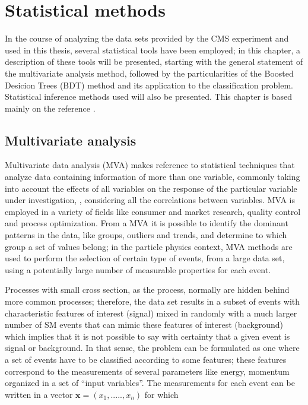 \chapter{Statistical methods}\label{ch:stat}

In the course of analyzing the data sets provided by the CMS experiment and used in this thesis, several statistical tools have been employed; in this chapter, a description of these tools will be presented, starting with the general statement of the multivariate analysis method, followed by the particularities of the Boosted Desicion Trees (BDT) method and its application to the classification problem. Statistical inference methods used will also be presented. This chapter is based mainly on the reference \cite{mva}.      

\section{Multivariate analysis}

Multivariate data analysis (MVA) makes reference to statistical techniques that analyze data containing information of more than one variable, commonly taking into account the effects of all variables on the response of the particular variable under investigation, \ie, considering all the correlations between variables. MVA is employed in a variety of fields like consumer and market research, quality control and process optimization. From a MVA it is possible to identify the dominant patterns in the data, like groups, outliers and trends, and determine to which group a set of values belong; in the particle physics context, MVA methods are used to perform the selection of certain type of events, from a large data set, using a potentially large number of measurable properties for each event.

Processes with small cross section, as the \tHq process, normally are hidden behind more common processes; therefore, the data set results in a subset of events with characteristic features of interest (signal) mixed in randomly with a much larger number of SM events that can mimic these features of interest (background) which implies that it is not possible to say with certainty that a given event is signal or background. In that sense, the problem can be formulated as one where a set of events have to be classified according to some features; these features correspond to the measurements of several parameters like energy, momentum organized in a set of ``input variables''. The measurements for each event can be written in a vector $\textbf{x}=(x_1,.....,x_n)$ for which

